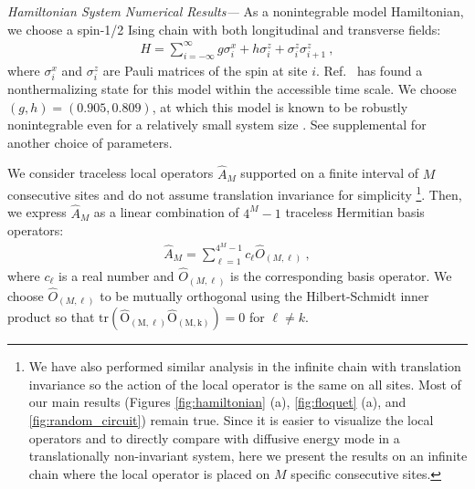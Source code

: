\documentclass[twocolumn,superscriptaddress, prl,showpacs]{revtex4-1}
\begin{document}
{\it Hamiltonian System Numerical Results---}
As a nonintegrable model Hamiltonian, we choose a spin-1/2 Ising chain with both longitudinal and transverse fields:
\begin{align}
H = \sum_{i = -\infty}^{\infty} g\sigma^x_i + h\sigma^z_i + \sigma^z_i \sigma^z_{i+1} ~,
\label{eq:Hamiltonian}
\end{align}
where $\sigma^x_i$ and $\sigma^z_i$ are Pauli matrices of the spin at site $i$.
Ref.~ has found a nonthermalizing state for this model within the accessible time scale.
We choose $(g,h) = (0.905, 0.809)$, at which this model is known to be robustly nonintegrable even for a relatively small system size \cite{Kim:2013}.
See supplemental for another choice of parameters.

We consider traceless local operators $\hat{A}_M$ supported on a finite interval of $M$ consecutive sites and do not assume translation invariance for simplicity
\footnote{We have also performed similar analysis in the infinite chain with translation invariance so the action of the local operator is the same on all sites. Most of our main results (Figures \ref{fig:hamiltonian} (a), \ref{fig:floquet} (a), and \ref{fig:random_circuit})
remain true. Since it is easier to visualize the local operators and to directly compare with diffusive energy mode in a translationally non-invariant system, here we present the results on an infinite chain where the local operator is placed on $M$ specific consecutive sites.}.
Then, we express $\hat{A}_M$ as a linear combination of $4^M - 1$ traceless Hermitian basis operators:  
\begin{align}
\hat{A}_M = \sum_{\ell = 1}^{4^M - 1} c_\ell \hat{O}_{(M,\ell)} ~,
\end{align}
where $c_\ell$ is a real number and $\hat{O}_{(M,\ell)}$ is the corresponding basis operator.
We choose $\hat{O}_{(M,\ell)}$ to be mutually orthogonal using the Hilbert-Schmidt inner product so that
$\mathrm{tr(\hat{O}_{(M,\ell)} \hat{O}_{(M,k)})} = 0$ for $\ell\neq k$.
\end{document}
